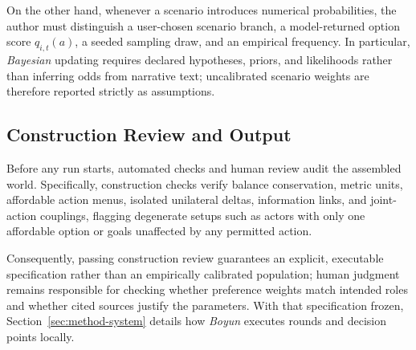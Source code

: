 On the other hand, whenever a scenario introduces numerical probabilities,
the author must distinguish a user-chosen scenario branch, a model-returned
option score $q_{i,t}(a)$, a seeded sampling draw, and an empirical frequency.
In particular, \textit{Bayesian} updating requires declared hypotheses, priors,
and likelihoods \cite{pishronik2014} rather than inferring odds from narrative
text; uncalibrated scenario weights are therefore reported strictly as
assumptions.

\subsection{Construction Review and Output}
Before any run starts, automated checks and human review audit the assembled
world. Specifically, construction checks verify balance conservation, metric
units, affordable action menus, isolated unilateral deltas, information links,
and joint-action couplings, flagging degenerate setups such as actors with only
one affordable option or goals unaffected by any permitted action.

Consequently, passing construction review guarantees an explicit,
executable specification rather than an empirically calibrated population;
human judgment remains responsible for checking whether preference weights match
intended roles and whether cited sources justify the parameters. With that
specification frozen, Section~\ref{sec:method-system} details how
\textit{Boyun} executes rounds and decision points locally.
